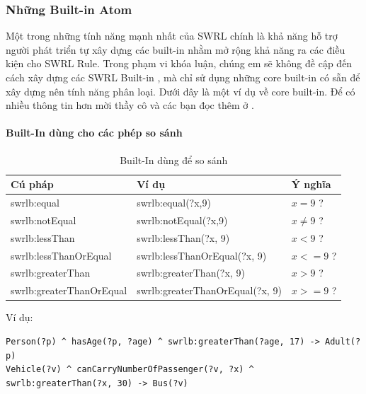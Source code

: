 \subsubsection{Những Built-in Atom}
Một trong những tính năng mạnh nhất của SWRL chính là khả năng hỗ trợ người phát triển tự xây dựng các built-in nhằm mở rộng khả năng ra các điều kiện cho SWRL Rule. Trong phạm vi khóa luận, chúng em sẽ không đề cập đến cách xây dựng các SWRL Built-in \cite{swrlbuiltin}, mà chỉ sử dụng những core built-in \cite{swrlcorebuiltin} có sẵn để xây dựng nên tính năng phân loại. Dưới đây là một ví dụ về core built-in. Để có nhiều thông tin hơn mời thầy cô và các bạn đọc thêm ở \cite{swrlcorebuiltin}.
\paragraph{Built-In dùng cho các phép so sánh}
\begin{table}[!h]
	\centering
	\begin{tabular}{|l|l|l|}
		\hline
		Cú pháp & Ví dụ & Ý nghĩa \\ 
		\hline
		swrlb:equal & swrlb:equal(?x,9) & $x = 9$  ? \\		
		\hline
		swrlb:notEqual & swrlb:notEqual(?x,9) & $x \neq 9$  ? \\		
		\hline
		swrlb:lessThan & swrlb:lessThan(?x, 9) & $x < 9$ ? \\
		\hline
		swrlb:lessThanOrEqual & swrlb:lessThanOrEqual(?x, 9) & $x <= 9$ ? \\
		\hline
		swrlb:greaterThan & swrlb:greaterThan(?x, 9) & $x > 9$ ? \\
		\hline
		swrlb:greaterThanOrEqual & swrlb:greaterThanOrEqual(?x, 9) & $x >= 9$ ? \\
		\hline
	\end{tabular}
	\caption{Built-In dùng để so sánh\label{overflow}}
\end{table}
Ví dụ:
\begin{verbatim}
Person(?p) ^ hasAge(?p, ?age) ^ swrlb:greaterThan(?age, 17) -> Adult(?p)
Vehicle(?v) ^ canCarryNumberOfPassenger(?v, ?x) ^ 
swrlb:greaterThan(?x, 30) -> Bus(?v)
\end{verbatim}

